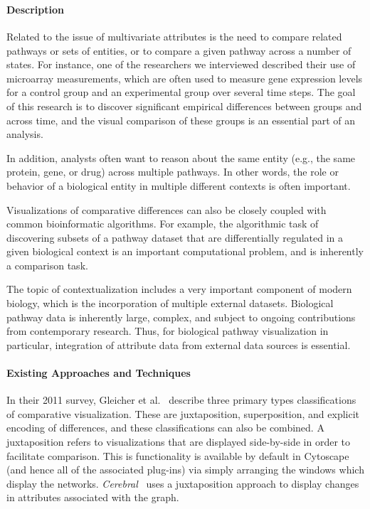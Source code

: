 \documentclass[twocolumn]{bmcart}%
\begin{document}

\ \\ \

\paragraph*{Description}

Related to the issue of multivariate attributes is the need to compare related pathways or sets of entities, or to compare a given pathway across a number of states.
For instance, one of the researchers we interviewed described their use of microarray measurements, which are often used to measure gene expression levels for a control group and an experimental group over several time steps.
The goal of this research is to discover significant empirical differences between groups and across time, and the visual comparison of these groups is an essential part of an analysis.

In addition, analysts often want to reason about the same entity (e.g., the same protein, gene, or drug) across multiple pathways.
In other words, the role or behavior of a biological entity in multiple different contexts is often important.

Visualizations of comparative differences can also be closely coupled with common bioinformatic algorithms.
For example, the algorithmic task of discovering subsets of a pathway dataset that are differentially regulated in a given biological context is an important computational problem, and is inherently a comparison task.

The topic of contextualization includes a very important component of modern biology, which is the incorporation of multiple external datasets.
Biological pathway data is inherently large, complex, and subject to ongoing contributions from contemporary research.
Thus, for biological pathway visualization in particular, integration of attribute data from external data sources is essential.

\paragraph*{Existing Approaches and Techniques}

In their 2011 survey, Gleicher et al.~\cite{Gleicher2011} describe three primary types classifications of comparative visualization.
These are juxtaposition, superposition, and explicit encoding of differences, and these classifications can also be combined.
A juxtaposition refers to visualizations that are displayed side-by-side in order to facilitate comparison.
This is functionality is available by default in Cytoscape (and hence all of the associated plug-ins) via simply arranging the windows which display the networks.
\textit{Cerebral}~\cite{Barsky2008cerebral} uses a juxtaposition approach to display changes in attributes associated with the graph.
\end{document}
